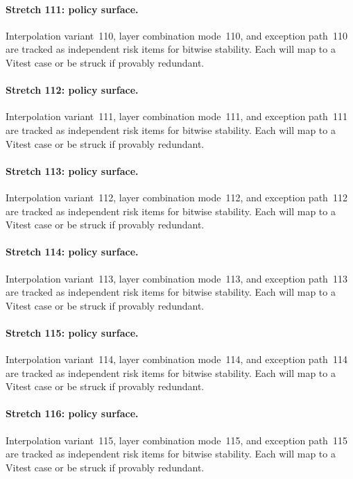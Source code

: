 \documentclass[sigconf,nonacm]{acmart}
\begin{document}
\paragraph{Stretch 111: policy surface.}
Interpolation variant~110, layer combination mode~110, and exception path~110 are tracked as independent risk items for bitwise stability. Each will map to a Vitest case or be struck if provably redundant. %

\paragraph{Stretch 112: policy surface.}
Interpolation variant~111, layer combination mode~111, and exception path~111 are tracked as independent risk items for bitwise stability. Each will map to a Vitest case or be struck if provably redundant. %

\paragraph{Stretch 113: policy surface.}
Interpolation variant~112, layer combination mode~112, and exception path~112 are tracked as independent risk items for bitwise stability. Each will map to a Vitest case or be struck if provably redundant. %

\paragraph{Stretch 114: policy surface.}
Interpolation variant~113, layer combination mode~113, and exception path~113 are tracked as independent risk items for bitwise stability. Each will map to a Vitest case or be struck if provably redundant. %

\paragraph{Stretch 115: policy surface.}
Interpolation variant~114, layer combination mode~114, and exception path~114 are tracked as independent risk items for bitwise stability. Each will map to a Vitest case or be struck if provably redundant. %

\paragraph{Stretch 116: policy surface.}
Interpolation variant~115, layer combination mode~115, and exception path~115 are tracked as independent risk items for bitwise stability. Each will map to a Vitest case or be struck if provably redundant. %
\end{document}
